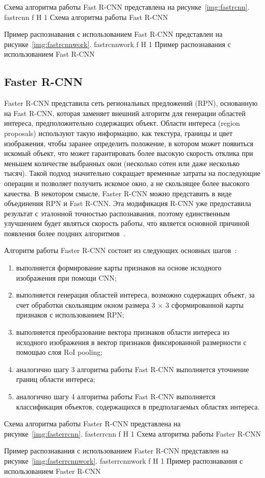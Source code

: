 \clearpage
Схема алгоритма работы Fast R-CNN представлена на рисунке~\ref{img:fastrcnn}.
	{fastrcnn}
	{f}
	{H}
	{1\textwidth}
	{Схема алгоритма работы Fast R-CNN}

Пример распознавания с использованием Fast R-CNN представлен на рисунке~\ref{img:fastrcnnwork}.
	{fastrcnnwork}
	{f}
	{H}
	{1\textwidth}
	{Пример распознавания с использованием Fast R-CNN}

\clearpage

\subsection{Faster R-CNN}

Faster R-CNN представила сеть региональных предложений (RPN), основанную на Fast R-CNN, которая заменяет внешний алгоритм для генерации областей интереса, предположительно содержащих объект.
Области интереса (region proposals) используют такую информацию, как текстура, границы и цвет изображения, чтобы заранее определить положение, в котором может появиться искомый объект, что может гарантировать более высокую скорость отклика при меньшем количестве выбранных окон (несколько сотен или даже несколько тысяч).
Такой подход значительно сокращает временные затраты на последующие операции и позволяет получить искомое окно, а не скользящее более высокого качества.
В некотором смысле, Faster R-CNN можно представить в виде объединения RPN и Fast R-CNN.
Эта модификация R-CNN уже предоставила результат с эталонной точностью распознавания, поэтому единственным улучшением будет являться скорость работы, что является основной причиной появления более поздних алгоритмов~\cite{fasterrcnn}.

Алгоритм работы Faster R-CNN состоит из следующих основных шагов~\cite{yolochina, rcnn, fasterrcnn}:
\begin{enumerate}
	\item выполняется формирование карты признаков на основе исходного изображения при помощи CNN;
	\item выполняется генерация областей интереса, возможно содержащих объект, за счет обработки скользящим окном размера 3 $\times$ 3 сформированной карты признаков с использованием RPN;
	\item выполняется преобразование вектора признаков области интереса из исходного изображения в вектор признаков фиксированной размерности с помощью слоя RoI pooling;
	\item аналогично шагу 3 алгоритма работы Fast R-CNN выполняется уточнение границ области интереса;
	\item аналогично шагу 4 алгоритма работы Fast R-CNN выполняется классификация объектов, содержащихся в предполагаемых областях интереса.
\end{enumerate}

\clearpage
Схема алгоритма работы Faster R-CNN представлена на рисунке~\ref{img:fasterrcnn}.
	{fasterrcnn}
	{f}
	{H}
	{1\textwidth}
	{Схема алгоритма работы Faster R-CNN}

Пример распознавания с использованием Faster R-CNN представлен на рисунке~\ref{img:fasterrcnnwork}.
	{fasterrcnnwork}
	{f}
	{H}
	{1\textwidth}
	{Пример распознавания с использованием Faster R-CNN}
